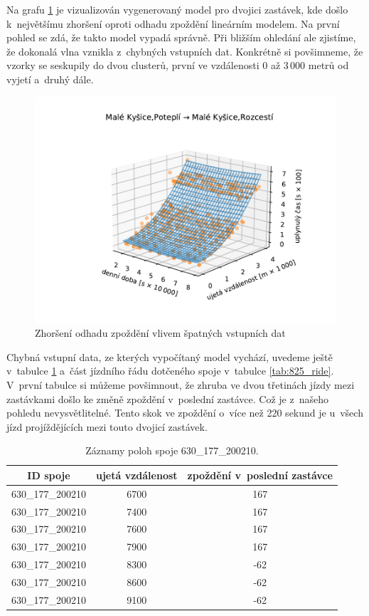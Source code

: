 \bigbreak

Na grafu \ref{fig:chyba} je vizualizován vygenerovaný model pro dvojici zastávek, kde došlo k~největšímu zhoršení oproti odhadu zpoždění lineárním modelem. Na první pohled se zdá, že takto model vypadá správně. Při bližším ohledání ale zjistíme, že dokonalá vlna vznikla z~chybných vstupních dat. Konkrétně si povšimneme, že vzorky se seskupily do dvou clusterů, první ve vzdálenosti 0 až 3\,000 metrů od vyjetí a~druhý dále.


\begin{figure}
   \centering
 \includegraphics[width=1\linewidth]{../img/808_809}
 \caption{Zhoršení odhadu zpoždění vlivem špatných vstupních dat}
 \label{fig:chyba}
\end{figure}


Chybná vstupní data, ze kterých vypočítaný model vychází, uvedeme ještě v~tabulce \ref{table:825_samples} a~část jízdního řádu dotčeného spoje v~tabulce \ref{tab:825_ride}. V~první tabulce si můžeme povšimnout, že zhruba ve dvou třetinách jízdy mezi zastávkami došlo ke změně zpoždění v~poslední zastávce. Což je z~našeho pohledu nevysvětlitelné. Tento skok ve zpoždění o~více než 220 sekund je u~všech jízd projíždějících mezi touto dvojicí zastávek.


\begin{center}
   \begin{table}[ht]
\centering
\begin{tabular}{|c|c|c|}
\hline
ID spoje & ujetá vzdálenost & zpoždění v~poslední zastávce \\ \hline \hline
630\_177\_200210 & 6700 & 167 \\ \hline
630\_177\_200210 & 7400 & 167 \\ \hline
630\_177\_200210 & 7600 & 167 \\ \hline
630\_177\_200210 & 7900 & 167 \\ \hline
630\_177\_200210 & 8300 & -62 \\ \hline
630\_177\_200210 & 8600 & -62 \\ \hline
630\_177\_200210 & 9100 & -62 \\ \hline
\end{tabular}
\label{table:825_samples}
\caption{Záznamy poloh spoje 630\_177\_200210.}
\end{table}
\end{center}


